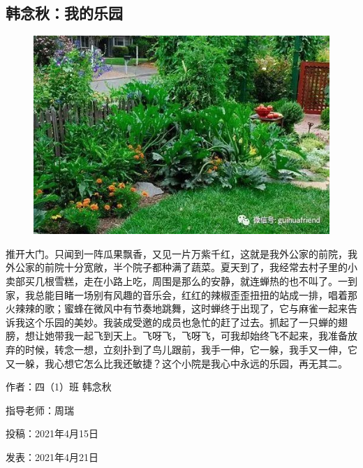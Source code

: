 \vspace{10pt}

{\centering\subsection*{韩念秋：我的乐园}}


\renewcommand{\leftmark}{韩念秋：我的乐园}

\begin{figure}[htbp]

\centering

\includegraphics[width = .5\textwidth]{./ch/41.jpg}

\end{figure}



推开大门。只闻到一阵瓜果飘香，又见一片万紫千红，这就是我外公家的前院，我外公家的前院十分宽敞，半个院子都种满了蔬菜。夏天到了，我经常去村子里的小卖部买几根雪糕，走在小路上吃，周围是那么的安静，就连蝉热的也不叫了。一到家，我总能目睹一场别有风趣的音乐会，红红的辣椒歪歪扭扭的站成一排，唱着那火辣辣的歌；蜜蜂在微风中有节奏地跳舞，这时蝉终于出现了，它与麻雀一起来告诉我这个乐园的美妙。我装成受邀的成员也急忙的赶了过去。抓起了一只蝉的翅膀，想让她带我一起飞到天上。飞呀飞，飞呀飞，可我却始终飞不起来，我准备放弃的时候，转念一想，立刻扑到了鸟儿跟前，我手一伸，它一躲，我手又一伸，它又一躲，我心想它怎么比我还敏捷？这个小院是我心中永远的乐园，再无其二。



\vspace{10pt}



作者：四（1）班 韩念秋

指导老师：周瑞

投稿：2021年4月15日

发表：2021年4月21日


                



\vspace{10pt}

\hline



